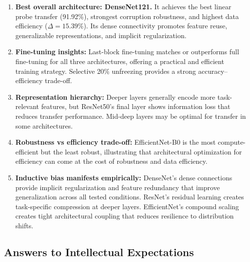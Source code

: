 \documentclass[11pt, a4paper]{article}
\begin{document}
\begin{enumerate}
    \item \textbf{Best overall architecture: DenseNet121.} It achieves the best linear probe transfer (91.92\%), strongest corruption robustness, and highest data efficiency ($\Delta = 15.39\%$). Its dense connectivity promotes feature reuse, generalizable representations, and implicit regularization.
    
    \item \textbf{Fine-tuning insights:} Last-block fine-tuning matches or outperforms full fine-tuning for all three architectures, offering a practical and efficient training strategy. Selective 20\% unfreezing provides a strong accuracy–efficiency trade-off.
    
    \item \textbf{Representation hierarchy:} Deeper layers generally encode more task-relevant features, but ResNet50's final layer shows information loss that reduces transfer performance. Mid-deep layers may be optimal for transfer in some architectures.
    
    \item \textbf{Robustness vs efficiency trade-off:} EfficientNet-B0 is the most compute-efficient but the least robust, illustrating that architectural optimization for efficiency can come at the cost of robustness and data efficiency.
    
    \item \textbf{Inductive bias manifests empirically:} DenseNet's dense connections provide implicit regularization and feature redundancy that improve generalization across all tested conditions. ResNet's residual learning creates task-specific compression at deeper layers. EfficientNet's compound scaling creates tight architectural coupling that reduces resilience to distribution shifts.
\end{enumerate}

\subsection{Answers to Intellectual Expectations}
\end{document}

